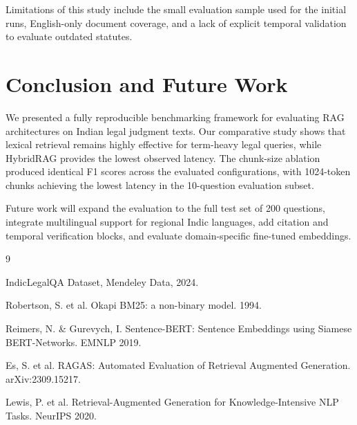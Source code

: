 \documentclass[11pt]{article}
\begin{document}
Limitations of this study include the small evaluation sample used for the initial runs, English-only document coverage, and a lack of explicit temporal validation to evaluate outdated statutes.

\section{Conclusion and Future Work}

We presented a fully reproducible benchmarking framework for evaluating RAG architectures on Indian legal judgment texts. Our comparative study shows that lexical retrieval remains highly effective for term-heavy legal queries, while HybridRAG provides the lowest observed latency. The chunk-size ablation produced identical F1 scores across the evaluated configurations, with 1024-token chunks achieving the lowest latency in the 10-question evaluation subset.

Future work will expand the evaluation to the full test set of 200 questions, integrate multilingual support for regional Indic languages, add citation and temporal verification blocks, and evaluate domain-specific fine-tuned embeddings.

\begin{thebibliography}{9}

 IndicLegalQA Dataset, Mendeley Data, 2024.

 Robertson, S. et al. Okapi BM25: a non-binary model. 1994.

 Reimers, N. \& Gurevych, I. Sentence-BERT: Sentence Embeddings using Siamese BERT-Networks. EMNLP 2019.

 Es, S. et al. RAGAS: Automated Evaluation of Retrieval Augmented Generation. arXiv:2309.15217.

 Lewis, P. et al. Retrieval-Augmented Generation for Knowledge-Intensive NLP Tasks. NeurIPS 2020.

\end{thebibliography}
\end{document}
